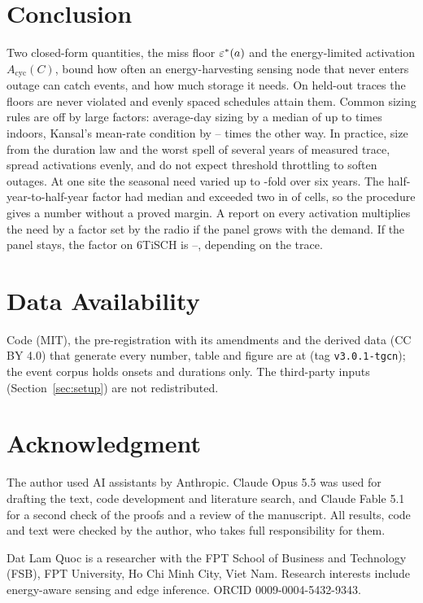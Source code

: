 \section{Conclusion}\label{sec:conclusion}
Two closed-form quantities, the miss floor $\varepsilon^*(a)$ and the energy-limited activation $A_{\mathrm{cyc}}(C)$, bound how often an energy-harvesting sensing node that never enters outage can catch events, and how much storage it needs. On held-out traces the floors are never violated and evenly spaced schedules attain them. Common sizing rules are off by large factors: average-day sizing by a median of up to \avgIn{} times indoors, Kansal's mean-rate condition by \kmeanInvLo--\kmeanInvHi{} times the other way. In practice, size from the duration law and the worst spell of several years of measured trace, spread activations evenly, and do not expect threshold throttling to soften outages. At one site the seasonal need varied up to \AivbHi{}-fold over six years. The half-year-to-half-year factor had median \KMedS{} and exceeded two in \KGtTwoS{} of \nCellsSS{} cells, so the procedure gives a number without a proved margin. A report on every activation multiplies the need by a factor set by the radio if the panel grows with the demand. If the panel stays, the factor on 6TiSCH is \AvSixMin--\AvSixMax, depending on the trace.

\section*{Data Availability}
Code (MIT), the pre-registration with its amendments and the derived data (CC BY 4.0) that generate every number, table and figure are at \repoURL{} (tag \texttt{v3.0.1-tgcn}); the event corpus holds onsets and durations only. The third-party inputs (Section~\ref{sec:setup}) are not redistributed.

\section*{Acknowledgment}
The author used AI assistants by Anthropic. Claude Opus 5.5 was used for drafting the text, code development and literature search, and Claude Fable 5.1 for a second check of the proofs and a review of the manuscript. All results, code and text were checked by the author, who takes full responsibility for them.




\begin{IEEEbiographynophoto}{Dat Lam Quoc}
is a researcher with the FPT School of Business and Technology (FSB), FPT University, Ho Chi Minh City, Viet Nam. Research interests include energy-aware sensing and edge inference. ORCID 0009-0004-5432-9343.
\end{IEEEbiographynophoto}
